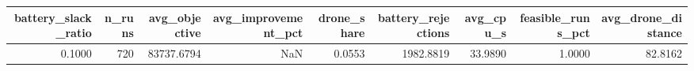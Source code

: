 \begin{tabular}{rrrrrrrrr}
\toprule
battery_slack_ratio & n_runs & avg_objective & avg_improvement_pct & drone_share & battery_rejections & avg_cpu_s & feasible_runs_pct & avg_drone_distance \\
\midrule
0.1000 & 720 & 83737.6794 & NaN & 0.0553 & 1982.8819 & 33.9890 & 1.0000 & 82.8162 \\
\bottomrule
\end{tabular}
